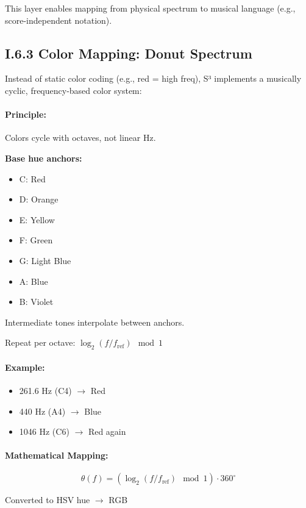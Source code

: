 This layer enables mapping from physical spectrum to musical language (e.g., score-independent notation).

\subsection*{I.6.3 Color Mapping: Donut Spectrum}

Instead of static color coding (e.g., red = high freq), S³ implements a musically cyclic, frequency-based color system:

\paragraph{Principle:}
Colors cycle with octaves, not linear Hz.

\textbf{Base hue anchors:}

\begin{itemize}
    \item C: Red
    \item D: Orange
    \item E: Yellow
    \item F: Green
    \item G: Light Blue
    \item A: Blue
    \item B: Violet
\end{itemize}

Intermediate tones interpolate between anchors.

Repeat per octave: $\log_2(f/f_{\text{ref}}) \mod 1$

\paragraph{Example:}
\begin{itemize}
    \item 261.6 Hz (C4) $\rightarrow$ Red
    \item 440 Hz (A4) $\rightarrow$ Blue
    \item 1046 Hz (C6) $\rightarrow$ Red again
\end{itemize}

\paragraph{Mathematical Mapping:}

\[
\theta(f) = (\log_2(f/f_{\text{ref}}) \mod 1) \cdot 360^\circ
\]

Converted to HSV hue $\rightarrow$ RGB

